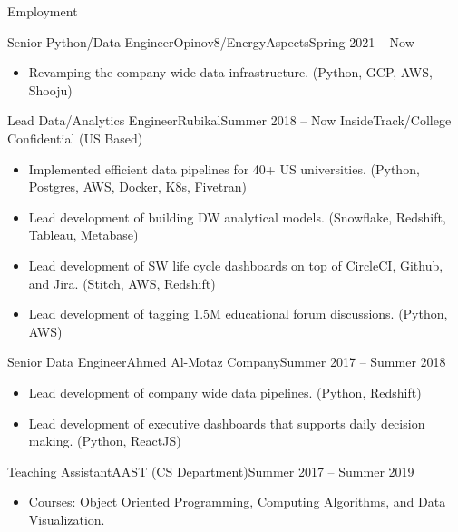 \documentclass[]{ahmedamrcv}
\begin{document}
	\makeheader
	
	\begin{cvsection}{Employment}
		\begin{cvsubsection}{Senior Python/Data Engineer}{Opinov8/EnergyAspects}{Spring 2021 -- Now}
			\begin{itemize}
				\item Revamping the company wide data infrastructure. (Python, GCP, AWS, Shooju)
			\end{itemize}
		\end{cvsubsection}

		\begin{cvsubsection}{Lead Data/Analytics Engineer}{Rubikal}{Summer 2018 -- Now}
			{InsideTrack/College Confidential} (US Based)			
			\begin{itemize}
				\item Implemented efficient data pipelines for 40+ US universities. (Python, Postgres, AWS, Docker, K8s, Fivetran)
				\item Lead development of building DW analytical models. (Snowflake, Redshift, Tableau, Metabase)
				\item Lead development of SW life cycle dashboards on top of CircleCI, Github, and Jira. (Stitch, AWS, Redshift)
				\item Lead development of tagging 1.5M educational forum discussions. (Python, AWS)
			\end{itemize}
		\end{cvsubsection}
		
		\begin{cvsubsection}{Senior Data Engineer}{Ahmed Al-Motaz Company}{Summer 2017 -- Summer 2018}	
			\begin{itemize}
				\item Lead development of company wide data pipelines. (Python, Redshift)
				\item Lead development of executive dashboards that supports daily decision making. (Python, ReactJS)
			\end{itemize}
		\end{cvsubsection}
		
		\begin{cvsubsection}{Teaching Assistant}{AAST (CS Department)}{Summer 2017 -- Summer 2019}		
			\begin{itemize}
				\item Courses: Object Oriented Programming, Computing Algorithms, and Data Visualization.
			\end{itemize}
		\end{cvsubsection}
		

\end{cvsection}
\end{document}
